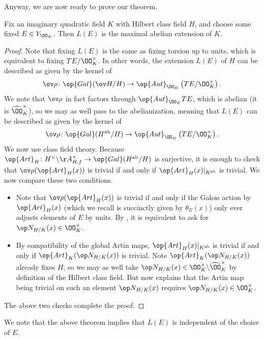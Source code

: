 \documentclass[../notes.tex]{subfiles}
\begin{document}
Anyway, we are now ready to prove our theorem.
\begin{theorem}
	Fix an imaginary quadratic field $K$ with Hilbert class field $H$, and choose some fixed $E\in Y_{\OO_K}$. Then $L(E)$ is the maximal abelian extension of $K$.
\end{theorem}
\begin{proof}
	Note that fixing $L(E)$ is the same as fixing torsion up to units, which is equivalent to fixing $TE/\OO_K^\times$. In other words, the extension $L(E)$ of $H$ can be described as given by the kernel of
	\[\ov\rho\colon\op{Gal}(\ov H/H)\to\op{Aut}_{\OO_K}\left(TE/\OO_K^\times\right).\]
	We note that $\ov\rho$ in fact factors through $\op{Aut}_{\OO_K}TE$, which is abelian (it is $\widehat\OO_K^\times$), so we may as well pass to the abelianization, meaning that $L(E)$ can be described as given by the kernel of
	\[\ov\rho\colon\op{Gal}(H^{\mathrm{ab}}/H)\to\op{Aut}_{\OO_K}\left(TE/\OO_K^\times\right).\]
	We now use class field theory. Because $\op{Art}_H\colon H^\times\backslash\AA_{H,f}^\times\to\op{Gal}(H^{\mathrm{ab}}/H)$ is surjective, it is enough to check that $\ov\rho(\op{Art}_H(x))$ is trivial if and only if $\op{Art}_H(x)|_{K^{\mathrm{ab}}}$ is trivial. We now compare these two conditions.
	\begin{itemize}
		\item Note that $\ov\rho(\op{Art}_H(x))$ is trivial if and only if the Galois action by $\op{Art}_H(x)$ (which we recall is succinctly given by $\theta_E(x)$) only ever adjusts elements of $E$ by units. By , it is equivalent to ask for $\op N_{H/K}(x)\in\OO_K^\times$.
		\item By compatibility of the global Artin maps, $\op{Art}_H(x)|_{K^{\mathrm{ab}}}$ is trivial if and only if $\op{Art}_K(\op N_{H/K}(x))$ is trivial. Note $\op{Art}_K(\op N_{H/K}(x))$ already fixes $H$, so we may as well take $\op N_{H/K}(x)\in\OO_K^\times\backslash\widehat\OO_K^\times$ by definition of the Hilbert class field. But now \cite[Corollary~8.2.2]{neukirch-cohom} explains that the Artin map being trivial on such an element $\op N_{H/K}(x)$ requires $\op N_{H/K}(x)\in\OO_K^\times$.
	\end{itemize}
	The above two checks complete the proof.
\end{proof}
\begin{remark}
	We note that the above theorem implies that $L(E)$ is independent of the choice of $E$.
\end{remark}
\end{document}

